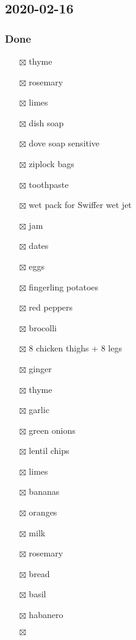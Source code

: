 \documentclass[
]{article}
\providecommand{\tightlist}{%
  \setlength{\itemsep}{0pt}\setlength{\parskip}{0pt}}
\begin{document}
\hypertarget{section-1}{%
\subsection{2020-02-16}\label{section-1}}

\hypertarget{done-1}{%
\subsubsection{Done}\label{done-1}}

\begin{itemize}
\tightlist
\item[$\boxtimes$]
  thyme
\item[$\boxtimes$]
  rosemary
\item[$\boxtimes$]
  limes
\item[$\boxtimes$]
  dish soap
\item[$\boxtimes$]
  dove soap sensitive
\item[$\boxtimes$]
  ziplock bags
\item[$\boxtimes$]
  toothpaste
\item[$\boxtimes$]
  wet pack for Swiffer wet jet
\item[$\boxtimes$]
  jam
\item[$\boxtimes$]
  dates
\item[$\boxtimes$]
  eggs
\item[$\boxtimes$]
  fingerling potatoes
\item[$\boxtimes$]
  red peppers
\item[$\boxtimes$]
  brocolli
\item[$\boxtimes$]
  8 chicken thighs + 8 legs
\item[$\boxtimes$]
  ginger
\item[$\boxtimes$]
  thyme
\item[$\boxtimes$]
  garlic
\item[$\boxtimes$]
  green onions
\item[$\boxtimes$]
  lentil chips
\item[$\boxtimes$]
  limes
\item[$\boxtimes$]
  bananas
\item[$\boxtimes$]
  oranges
\item[$\boxtimes$]
  milk
\item[$\boxtimes$]
  rosemary
\item[$\boxtimes$]
  bread
\item[$\boxtimes$]
  basil
\item[$\boxtimes$]
  habanero
\item[$\boxtimes$]

\end{itemize}
\end{document}

